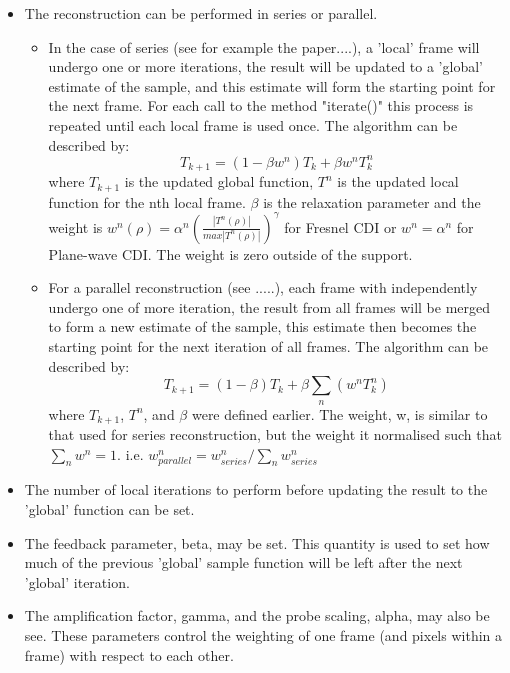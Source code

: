 \documentclass[]{nadia}
\begin{document}
\begin{itemize}

  \item The reconstruction can be performed in series or parallel.
    \begin{itemize}

      \item In the case of series (see for example the paper....), a
	'local' frame will undergo one or more iterations, the result
	will be updated to a 'global' estimate of the sample, and this
	estimate will form the starting point for the next frame. For
	each call to the method "iterate()" this process is repeated
	until each local frame is used once. The algorithm can be
	described by:
	\[ T_{k+1} = (1-\beta w^n)T_k + \beta w^n T^n_k \] 
	where $T_{k+1}$ is the updated global function, $T^n$ is the
	updated local function for the nth local frame. $\beta$ is the
	relaxation parameter and the weight is $ w^n(\rho) = \alpha^n
	(\frac{|T^n(\rho)|}{max|T^n(\rho)|} )^\gamma $ for Fresnel CDI
	or $w^n = \alpha^n$ for Plane-wave CDI. The weight is zero
	outside of the support.

      \item For a parallel reconstruction (see .....), each frame with
	independently undergo one of more iteration, the result from all
	frames will be merged to form a new estimate of the sample, this
	estimate then becomes the starting point for the next iteration
	of all frames. The algorithm can be described by:
	\[T_{k+1} = (1-\beta)T_k + \beta \sum_n(w^n T^n_k)\]
	where $T_{k+1}$, $T^n$, and $\beta$ were defined
	earlier. The weight, w, is similar to that used for series
	reconstruction, but the weight it normalised such that 
	$ \sum_n w^n = 1 $.  i.e. $ w^n_{parallel}= w^n_{series} / \sum_n w^n_{series} $

    \end{itemize}

  \item The number of local iterations to perform before updating the
    result to the 'global' function can be set.

  \item The feedback parameter, beta, may be set. This quantity is used
    to set how much of the previous 'global' sample function will be
    left after the next 'global' iteration.

  \item The amplification factor, gamma, and the probe scaling, alpha,
    may also be see. These parameters control the weighting of one frame
    (and pixels within a frame) with respect to each other.

\end{itemize}
\end{document}
